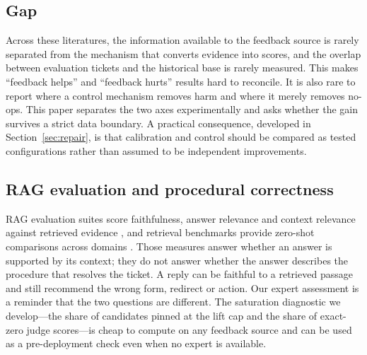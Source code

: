 \subsection{Gap}
Across these literatures, the information available to the feedback source is
rarely separated from the mechanism that converts evidence into scores, and the
overlap between evaluation tickets and the historical base is rarely measured.
This makes ``feedback helps'' and ``feedback hurts'' results hard to reconcile.
It is also rare to report where a control mechanism removes harm and where it
merely removes no-ops. This paper separates the two axes experimentally and asks
whether the gain survives a strict data boundary. A practical consequence,
developed in Section~\ref{sec:repair}, is that calibration and control should be
compared as tested configurations rather than assumed to be independent
improvements.

\subsection{RAG evaluation and procedural correctness}
RAG evaluation suites score faithfulness, answer relevance and context relevance
against retrieved evidence \cite{b40,b41,b42}, and retrieval benchmarks provide
zero-shot comparisons across domains \cite{b43}. Those measures answer whether an
answer is supported by its context; they do not answer whether the answer describes
the procedure that resolves the ticket. A reply can be faithful to a retrieved
passage and still recommend the wrong form, redirect or action. Our expert
assessment is a reminder that the two questions are different. The saturation
diagnostic we develop---the share of candidates pinned at the lift cap and the
share of exact-zero judge scores---is cheap to compute on any feedback source and
can be used as a pre-deployment check even when no expert is available.
